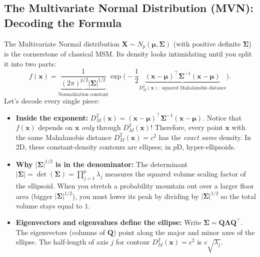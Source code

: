 \documentclass[11pt, a4paper]{article}
\begin{document}
\subsection{The Multivariate Normal Distribution (MVN): Decoding the Formula}
The Multivariate Normal distribution $\mathbf{X} \sim N_p(\boldsymbol{\mu}, \boldsymbol{\Sigma})$ (with positive definite $\boldsymbol{\Sigma}$) is the cornerstone of classical MSM. Its density looks intimidating until you split it into two parts:
\[
    f(\mathbf{x}) = \underbrace{\frac{1}{(2\pi)^{p/2} |\boldsymbol{\Sigma}|^{1/2}}}_{\text{Normalization constant}}
    \exp\!\Bigg( -\frac{1}{2} \underbrace{(\mathbf{x} - \boldsymbol{\mu})^\top \boldsymbol{\Sigma}^{-1} (\mathbf{x} - \boldsymbol{\mu})}_{D_M^2(\mathbf{x}): \text{ squared Mahalanobis distance}} \Bigg).
\]
Let's decode every single piece:
\begin{itemize}
    \item \textbf{Inside the exponent:} $D_M^2(\mathbf{x}) = (\mathbf{x} - \boldsymbol{\mu})^\top \boldsymbol{\Sigma}^{-1} (\mathbf{x} - \boldsymbol{\mu})$. Notice that $f(\mathbf{x})$ depends on $\mathbf{x}$ \emph{only} through $D_M^2(\mathbf{x})$! Therefore, every point $\mathbf{x}$ with the same Mahalanobis distance $D_M^2(\mathbf{x}) = c^2$ has the \emph{exact same} density. In 2D, these constant-density contours are ellipses; in $p$D, hyper-ellipsoids.
    \item \textbf{Why $|\boldsymbol{\Sigma}|^{1/2}$ is in the denominator:} The determinant $|\boldsymbol{\Sigma}| = \det(\boldsymbol{\Sigma}) = \prod_{j=1}^p \lambda_j$ measures the squared volume scaling factor of the ellipsoid. When you stretch a probability mountain out over a larger floor area (bigger $|\boldsymbol{\Sigma}|^{1/2}$), you must lower its peak by dividing by $|\boldsymbol{\Sigma}|^{1/2}$ so the total volume stays equal to $1$.
    \item \textbf{Eigenvectors and eigenvalues define the ellipse:} Write $\boldsymbol{\Sigma} = \mathbf{Q}\boldsymbol{\Lambda}\mathbf{Q}^\top$. The eigenvectors (columns of $\mathbf{Q}$) point along the major and minor axes of the ellipse. The half-length of axis $j$ for contour $D_M^2(\mathbf{x}) = c^2$ is $c\sqrt{\lambda_j}$.
\end{itemize}
\end{document}
